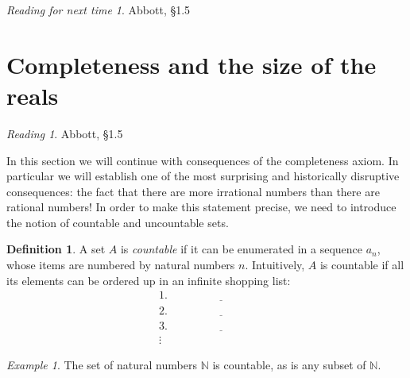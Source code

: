 \documentclass[11pt,oneside]{amsbook}
\newcommand{\N}{\mathbb N}
\theoremstyle{definition}
\theoremstyle{plain}
\theoremstyle{definition}
\newtheorem{definition}[theorem]{Definition}
\theoremstyle{remark}
\newtheorem{example}[theorem]{Example}
\newtheorem*{reading}{Reading}
\newtheorem*{readnext}{Reading for next time}
\numberwithin{equation}{section}
\numberwithin{figure}{section}
\begin{document}
\vspace{\fill}
\begin{readnext}
  Abbott, \S 1.5
\end{readnext}

\newpage
\section{Completeness and the size of the reals}

\begin{reading}
  Abbott, \S 1.5
\end{reading}

In this section we will continue with consequences of the completeness axiom. In particular we will establish one of the most surprising and historically disruptive consequences: the fact that there are more irrational numbers than there are rational numbers! In order to make this statement precise, we need to introduce the notion of countable and uncountable sets.

\begin{definition}
  A set $A$ is \emph{countable} if it can be enumerated in a sequence $a_n$, whose items are numbered by natural numbers $n$. Intuitively, $A$ is countable if all its elements can be ordered up in an infinite shopping list:
  \begin{align*}
    1.&\quad\underline{\hspace{1in}}\\
    2.&\quad\underline{\hspace{1in}}\\
    3.&\quad\underline{\hspace{1in}}\\
    \vdots&
  \end{align*}
\end{definition}

\begin{example}
  The set of natural numbers $\N$ is countable, as is any subset of $\N$.
\end{example}
\end{document}
